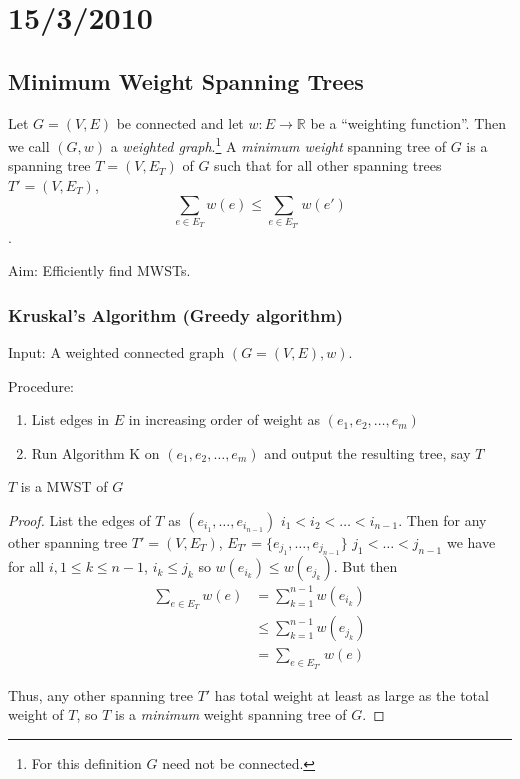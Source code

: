 \documentclass{article}
\begin{document}
\section*{15/3/2010}

\subsection*{Minimum Weight Spanning Trees}
Let $G=(V,E)$ be connected and let $w: E \rightarrow \mathbb{R}$ be a ``weighting function''.  Then we call $(G,w)$ a \emph{weighted graph}.\footnote{For this definition $G$ need not be connected.}  A \emph{minimum weight} spanning tree of $G$ is a spanning tree $T=(V, E_T)$ of $G$ such that for all other spanning trees $T'=(V,E_T)$, \[\sum_{e \in E_T} w(e) \le \sum_{e \in E_{T'}} w(e')\].

Aim: Efficiently find MWSTs.

\subsubsection*{Kruskal's Algorithm (Greedy algorithm)}

Input: A weighted connected graph $(G=(V,E),w)$.

Procedure: 
\begin{enumerate}
 \item List edges in $E$ in increasing order of weight as $(e_1, e_2, \ldots, e_m)$
\item Run Algorithm K on $(e_1, e_2, \ldots, e_m)$ and output the resulting tree, say $T$
\end{enumerate}

\begin{clm}
$T$ is a MWST of $G$
\end{clm}

\begin{proof}
List the edges of $T$ as $(e_{i_1}, \ldots, e_{i_{n-1}})$ $i_1 < i_2 < \ldots < i_{n-1}$.  Then for any other spanning tree $T' = (V,  E_T)$, $E_{T'} = \{e_{j_1} , \ldots , e_{j_{n-1}} \}$ $j_1 < \ldots < j_{n-1}$ we have for all $i, 1\le k \le n-1$, $i_k \le j_k$ so $w(e_{i_k}) \le w(e_{j_k})$.  But then 
\begin{align*}
\sum_{e \in E_T} w(e) &= \sum_{k=1}^{n-1} w(e_{i_k}) \\
& \le \sum_{k=1}^{n-1} w(e_{j_k}) \\
& = \sum_{e \in E_{T'}} w(e)
\end{align*}

Thus, any other spanning tree $T'$ has total weight at least as large as the total weight of $T$, so $T$ is a \emph{minimum} weight spanning tree of $G$.
\end{proof}
\end{document}
